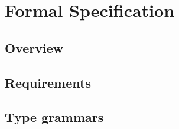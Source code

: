 \documentclass[../Dissertation.tex]{subfiles}
\begin{document}
\section{Formal Specification}
\subsection{Overview}
\subsection{Requirements}
\subsection{Type grammars}


\end{document}
